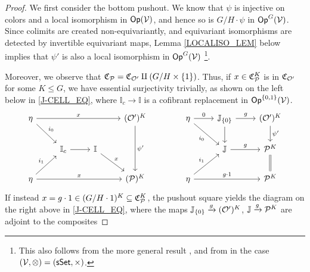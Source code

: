 \documentclass[a4paper,10pt
,draft
]{article}%
\renewcommand{\F}{\mathcal F}
\newcommand{\I}{\mathbb I}
\newcommand{\J}{\mathbb J}
\renewcommand{\1}{\eta}%
\begin{document}
\begin{proof}
      We first consider the bottom pushout.
      We know that $\psi$ is injective on colors and a local isomorphism in $\Op(\V)$,
      and hence so is $G/H \cdot \psi$ in $\Op^G(\V)$.
      Since colimits are created non-equivariantly, and equivariant isomorphisms are detected by invertible equivariant maps,
      Lemma \ref{LOCALISO_LEM} below implies that $\psi'$ is also a local isomorphism in $\Op^G(\V)$ \footnote{
        This also follows from the more general result \cite[Prop. B.22]{Cav},
        and from \cite[Prop. 1.28]{CM13b} in the case $(\V, \otimes) = (\sSet, \times)$.
      }.
      
      Moreover, we observe that $\C_{\P} = \C_{\O'} \amalg (G/H \times \set{1})$.
      Thus, if $x \in \C_{\P}^K$ is in $\C_{\O'}$ for some $K \leq G$, we have essential surjectivity trivially,
      as shown on the left below in \eqref{J-CELL_EQ},
      where $\I_c \to \I$ is a cofibrant replacement in $\Op^{\set{0,1}}(\V)$.
      \begin{equation}
            \label{J-CELL_EQ}
            \begin{tikzcd}
                  \1 \arrow[rrr, "x"] \arrow[dr, " i_0"]
                  &&&
                  (\O')^K \arrow[dd, "\psi'"]
                  &[15pt] %
                  \1 \arrow[r, "0"] \arrow[dr, "i_0"']
                  &
                  \J_{\set{0}} \arrow[d] \arrow[r, "g"]
                  &
                  (\O')^K \arrow[d, "{\psi'}"]
                  \\
                  &
                  \I_c \arrow[r]
                  &
                  \I \arrow[dr, "x"]
                  &
                  & %
                  &
                  \J \arrow[r, "g"]
                  &
                  \P^K \arrow[d, equal]
                  \\
                  \1 \arrow[ur, " i_1"] \arrow[rrr,"x"]
                  &&&
                  (\P)^K
                  & %
                  \1 \arrow[rr, "g \cdot 1"] \arrow[ur, "i_1"]
                  &&
                  \P^K
            \end{tikzcd}
      \end{equation}
      If instead $x  = g \cdot 1 \in (G/H \cdot 1)^K \subseteq \mathfrak C_\P^K$,
      the pushout square yields the diagram on the right above in \eqref{J-CELL_EQ},
      where the maps $\J_{\set{0}} \xrightarrow{g} (\O')^K$, $\J \xrightarrow{g} \P^K$ are adjoint to the composites

\end{proof}
\end{document}
